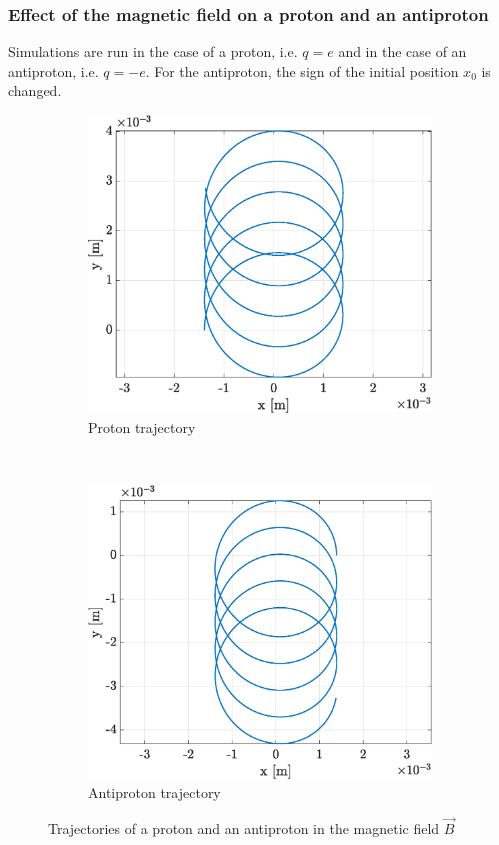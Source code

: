 \documentclass[a4paper,12pt,twoside]{article}
\begin{document}
\subsubsection{Effect of the magnetic field on a proton and an antiproton}

Simulations are run in the case of a proton, i.e. $q=e$ and in the case of an antiproton, i.e. $q=-e$. For the antiproton, the sign of the initial position $x_0$ is changed.

\begin{figure}[h]
\centering
\begin{subfigure}[t]{0.45\textwidth}
	\includegraphics[width=\textwidth]{graphs/app2_ipos_traj.eps}
	\caption{Proton trajectory}
	\label{fig:app2-ipos-traj}
\end{subfigure}
~
\begin{subfigure}[t]{0.45\textwidth}
	\includegraphics[width=\textwidth]{graphs/app2_ineg_traj.eps}
	\caption{Antiproton trajectory}
	\label{fig:app2-ineg-traj}
\end{subfigure}
\caption{Trajectories of a proton and an antiproton in the magnetic field $\vec{B}$}
\label{fig:app2_i_traj}
\end{figure}
\end{document}
